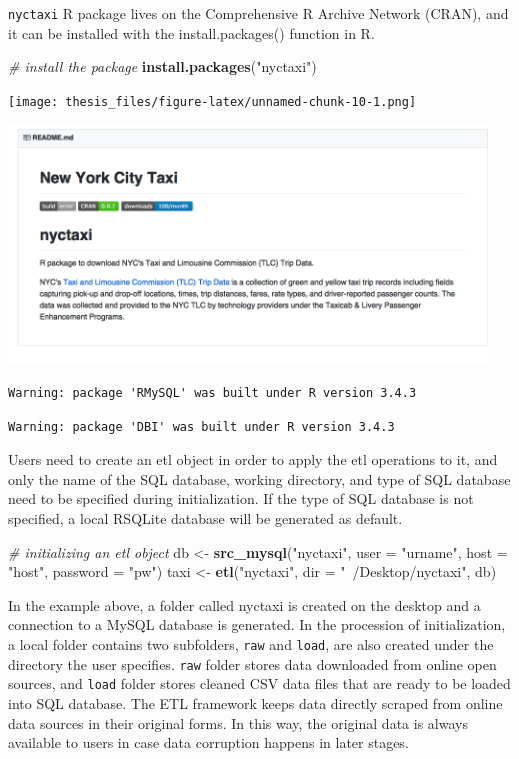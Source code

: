 \documentclass[12pt,twoside]{reedthesis}
\newenvironment{Shaded}{\begin{snugshade}}{\end{snugshade}}
\newcommand{\KeywordTok}[1]{\textcolor[rgb]{0.13,0.29,0.53}{\textbf{#1}}}
\newcommand{\DataTypeTok}[1]{\textcolor[rgb]{0.13,0.29,0.53}{#1}}
\newcommand{\StringTok}[1]{\textcolor[rgb]{0.31,0.60,0.02}{#1}}
\newcommand{\CommentTok}[1]{\textcolor[rgb]{0.56,0.35,0.01}{\textit{#1}}}
\newcommand{\NormalTok}[1]{#1}
\theoremstyle{definition}
\theoremstyle{definition}
\theoremstyle{definition}
\theoremstyle{remark}
\begin{document}
\texttt{nyctaxi} R package lives on the Comprehensive R Archive Network
(CRAN), and it can be installed with the install.packages() function in
R.
\begin{Shaded}
\begin{Highlighting}[]
\CommentTok{# install the package}
\KeywordTok{install.packages}\NormalTok{(}\StringTok{"nyctaxi"}\NormalTok{)}
\end{Highlighting}
\end{Shaded}
\texttt{[image: thesis\_files/figure-latex/unnamed-chunk-10-1.png]}
\begin{center}\includegraphics[width=5in]{figure/nyctaxi-page} \end{center}
\begin{verbatim}
Warning: package 'RMySQL' was built under R version 3.4.3
\end{verbatim}
\begin{verbatim}
Warning: package 'DBI' was built under R version 3.4.3
\end{verbatim}
Users need to create an etl object in order to apply the etl operations
to it, and only the name of the SQL database, working directory, and
type of SQL database need to be specified during initialization. If the
type of SQL database is not specified, a local RSQLite database will be
generated as default.
\begin{Shaded}
\begin{Highlighting}[]
\CommentTok{# initializing an etl object}
\NormalTok{db <-}\StringTok{ }\KeywordTok{src_mysql}\NormalTok{(}\StringTok{"nyctaxi"}\NormalTok{, }\DataTypeTok{user =} \StringTok{"urname"}\NormalTok{, }\DataTypeTok{host =} \StringTok{"host"}\NormalTok{, }
    \DataTypeTok{password =} \StringTok{"pw"}\NormalTok{)}
\NormalTok{taxi <-}\StringTok{ }\KeywordTok{etl}\NormalTok{(}\StringTok{"nyctaxi"}\NormalTok{, }\DataTypeTok{dir =} \StringTok{"~/Desktop/nyctaxi"}\NormalTok{, db)}
\end{Highlighting}
\end{Shaded}
In the example above, a folder called nyctaxi is created on the desktop
and a connection to a MySQL database is generated. In the procession of
initialization, a local folder contains two subfolders, \texttt{raw} and
\texttt{load}, are also created under the directory the user specifies.
\texttt{raw} folder stores data downloaded from online open sources, and
\texttt{load} folder stores cleaned CSV data files that are ready to be
loaded into SQL database. The ETL framework keeps data directly scraped
from online data sources in their original forms. In this way, the
original data is always available to users in case data corruption
happens in later stages.
\end{document}

